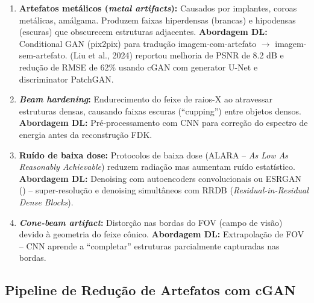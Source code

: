 \begin{enumerate}
  \item \textbf{Artefatos metálicos (\textit{metal artifacts}):} Causados por
        implantes, coroas metálicas, amálgama. Produzem faixas hiperdensas
        (brancas) e hipodensas (escuras) que obscurecem estruturas adjacentes.
        \textbf{Abordagem DL:} Conditional GAN (pix2pix) para tradução
        imagem-com-artefato $\to$ imagem-sem-artefato. 
        (Liu et al., 2024) reportou melhoria de PSNR de 8.2 dB e redução de
        RMSE de 62\% usando cGAN com generator U-Net e discriminator PatchGAN.

  \item \textbf{\textit{Beam hardening}:} Endurecimento do feixe de raios-X ao
        atravessar estruturas densas, causando faixas escuras (``cupping'')
        entre objetos densos. \textbf{Abordagem DL:} Pré-processamento com CNN
        para correção do espectro de energia antes da reconstrução FDK.

  \item \textbf{Ruído de baixa dose:} Protocolos de baixa dose (ALARA --
        \textit{As Low As Reasonably Achievable}) reduzem radiação mas aumentam
        ruído estatístico. \textbf{Abordagem DL:} Denoising com autoencoders
        convolucionais ou ESRGAN () -- super-resolução
        e denoising simultâneos com RRDB (\textit{Residual-in-Residual Dense
        Blocks}).

  \item \textbf{\textit{Cone-beam artifact}:} Distorção nas bordas do FOV
        (campo de visão) devido à geometria do feixe cônico. \textbf{Abordagem
        DL:} Extrapolação de FOV -- CNN aprende a ``completar'' estruturas
        parcialmente capturadas nas bordas.
\end{enumerate}

\subsection{Pipeline de Redução de Artefatos com cGAN}

